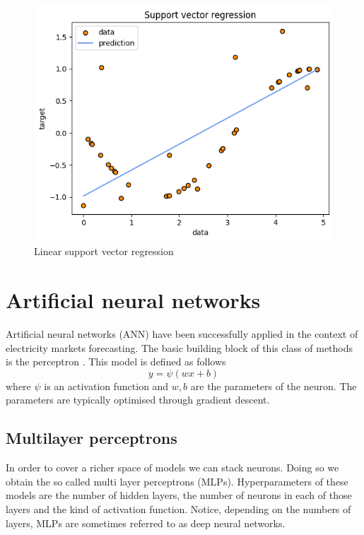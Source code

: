 \begin{figure}
    \includegraphics[width=\textwidth]{images/svr1.png}
    \caption{Linear support vector regression}
    \label{fig:svr1}
\end{figure}

\section{Artificial neural networks}
Artificial neural networks (ANN) have been successfully applied in the context of electricity markets forecasting. The basic building block of this class of methods is the perceptron \cite{rosenblatt1958perceptron}.
This model is defined as follows
\begin{equation}
    y=\psi(wx+b)
\end{equation}
where $\psi$ is an activation function and $w,b$ are the parameters of the neuron. The parameters are typically optimised through gradient descent.

\subsection{Multilayer perceptrons}
In order to cover a richer space of models we can stack neurons. Doing so we obtain the so called multi layer perceptrons (MLPs). Hyperparameters of these models are the number of hidden layers, the number of neurons in each of those layers and the kind of activation function.
Notice, depending on the numbers of layers, MLPs are sometimes referred to as deep neural networks.

